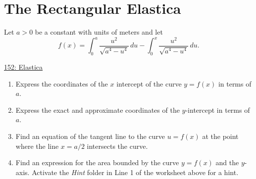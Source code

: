\documentclass{ximera}
\begin{document}
\section{The Rectangular Elastica}

Let $a>0$ be a constant with units of meters and let
\[
   f(x) = \int_0^a \frac{u^2}{\sqrt{a^4-u^4}} \, du - \int_0^x \frac{u^2}{\sqrt{a^4-u^4}} \, du .
\]

\begin{question} \label{QKDFeefrfr3}

\begin{onlineOnly}
    \begin{center}
\end{center}
\end{onlineOnly}

\href{https://www.desmos.com/calculator/c3vderglut}{152: Elastica}

\begin{enumerate}

\item Express the coordinates of the $x$ intercept of the curve $y=f(x)$ in terms of $a$.

\item Express the exact and approximate coordinates of the $y$-intercept in terms of $a$.

\item Find an equation of the tangent line to the curve $u=f(x)$ at the point where the line $x=a/2$ intersects the curve.

\item Find an expression for the area bounded by the curve $y=f(x)$ and the $y$-axis. Activate the \emph{Hint} folder in Line 1 of the worksheet above for a hint. 

\end{enumerate}

\end{question}
\end{document}
